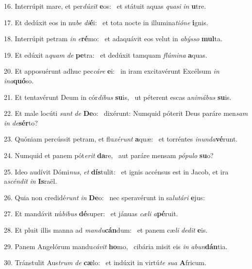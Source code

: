 16. Interrúpit mare, et per\textit{dú}\textit{xit} \textbf{e}os: \ast\  et státuit aquas \textit{qua}\textit{si} \textit{in} \textbf{u}tre.\

17. Et dedúxit eos in nu\textit{be} \textit{di}\textbf{é}i: \ast\  et tota nocte in illumina\textit{ti}\textit{ó}\textit{ne} \textbf{i}gnis.\

18. Interrúpit petram \textit{in} \textit{e}\textbf{ré}mo: \ast\  et adaquávit eos velut in \textit{a}\textit{býs}\textit{so} \textbf{mul}ta.\

19. Et edúxit a\textit{quam} \textit{de} \textbf{pe}tra: \ast\  et dedúxit tamquam \textit{flú}\textit{mi}\textit{na} \textbf{a}quas.\

20. Et apposuérunt adhuc pec\textit{cá}\textit{re} \textbf{e}i: \ast\  in iram excitavérunt Excélsum \textit{in} \textit{in}\textit{a}\textbf{quó}so.\

21. Et tentavérunt Deum in cór\textit{di}\textit{bus} \textbf{su}is, \ast\  ut péterent escas a\textit{ni}\textit{má}\textit{bus} \textbf{su}is.\

22. Et male locúti \textit{sunt} \textit{de} \textbf{De}o: \ast\  dixérunt: Numquid póterit Deus paráre men\textit{sam} \textit{in} \textit{de}\textbf{sér}to?\

23. Quóniam percússit petram, et flu\textit{xé}\textit{runt} \textbf{a}quæ: \ast\  et torréntes \textit{in}\textit{un}\textit{da}\textbf{vé}runt.\

24. Numquid et panem pót\textit{e}\textit{rit} \textbf{da}re, \ast\  aut paráre mensam \textit{pó}\textit{pu}\textit{lo} \textbf{su}o?\

25. Ideo audívit Dómi\textit{nus}, \textit{et} \textbf{dís}tulit: \ast\  et ignis accénsus est in Jacob, et ira a\textit{scén}\textit{dit} \textit{in} \textbf{Is}raël.\

26. Quia non credidé\textit{runt} \textit{in} \textbf{De}o: \ast\  nec speravérunt in sa\textit{lu}\textit{tá}\textit{ri} \textbf{e}jus:\

27. Et mandávit nú\textit{bi}\textit{bus} \textbf{dé}super: \ast\  et jánuas \textit{cæ}\textit{li} \textit{a}\textbf{pé}ruit.\

28. Et pluit illis manna ad \textit{man}\textit{du}\textbf{cán}dum: \ast\  et panem cæ\textit{li} \textit{de}\textit{dit} \textbf{e}is.\

29. Panem Angelórum mandu\textit{cá}\textit{vit} \textbf{ho}mo, \ast\  cibária misit eis \textit{in} \textit{ab}\textit{un}\textbf{dán}tia.\

30. Tránstulit Aus\textit{trum} \textit{de} \textbf{cæ}lo: \ast\  et indúxit in virtú\textit{te} \textit{su}\textit{a} \textbf{A}fricum.\


